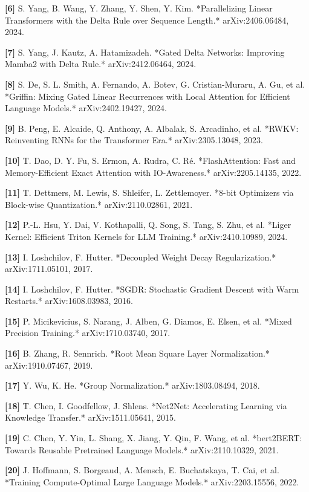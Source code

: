 \documentclass[11pt,openany]{ctexart}
\begin{document}
\textbf{[6]} S. Yang, B. Wang, Y. Zhang, Y. Shen, Y. Kim. *Parallelizing Linear Transformers with the Delta Rule over Sequence Length.* arXiv:2406.06484, 2024.

\textbf{[7]} S. Yang, J. Kautz, A. Hatamizadeh. *Gated Delta Networks: Improving Mamba2 with Delta Rule.* arXiv:2412.06464, 2024.

\textbf{[8]} S. De, S. L. Smith, A. Fernando, A. Botev, G. Cristian-Muraru, A. Gu, et al. *Griffin: Mixing Gated Linear Recurrences with Local Attention for Efficient Language Models.* arXiv:2402.19427, 2024.

\textbf{[9]} B. Peng, E. Alcaide, Q. Anthony, A. Albalak, S. Arcadinho, et al. *RWKV: Reinventing RNNs for the Transformer Era.* arXiv:2305.13048, 2023.

\textbf{[10]} T. Dao, D. Y. Fu, S. Ermon, A. Rudra, C. Ré. *FlashAttention: Fast and Memory-Efficient Exact Attention with IO-Awareness.* arXiv:2205.14135, 2022.

\textbf{[11]} T. Dettmers, M. Lewis, S. Shleifer, L. Zettlemoyer. *8-bit Optimizers via Block-wise Quantization.* arXiv:2110.02861, 2021.

\textbf{[12]} P.-L. Hsu, Y. Dai, V. Kothapalli, Q. Song, S. Tang, S. Zhu, et al. *Liger Kernel: Efficient Triton Kernels for LLM Training.* arXiv:2410.10989, 2024.

\textbf{[13]} I. Loshchilov, F. Hutter. *Decoupled Weight Decay Regularization.* arXiv:1711.05101, 2017.

\textbf{[14]} I. Loshchilov, F. Hutter. *SGDR: Stochastic Gradient Descent with Warm Restarts.* arXiv:1608.03983, 2016.

\textbf{[15]} P. Micikevicius, S. Narang, J. Alben, G. Diamos, E. Elsen, et al. *Mixed Precision Training.* arXiv:1710.03740, 2017.

\textbf{[16]} B. Zhang, R. Sennrich. *Root Mean Square Layer Normalization.* arXiv:1910.07467, 2019.

\textbf{[17]} Y. Wu, K. He. *Group Normalization.* arXiv:1803.08494, 2018.

\textbf{[18]} T. Chen, I. Goodfellow, J. Shlens. *Net2Net: Accelerating Learning via Knowledge Transfer.* arXiv:1511.05641, 2015.

\textbf{[19]} C. Chen, Y. Yin, L. Shang, X. Jiang, Y. Qin, F. Wang, et al. *bert2BERT: Towards Reusable Pretrained Language Models.* arXiv:2110.10329, 2021.

\textbf{[20]} J. Hoffmann, S. Borgeaud, A. Mensch, E. Buchatskaya, T. Cai, et al. *Training Compute-Optimal Large Language Models.* arXiv:2203.15556, 2022.
\end{document}
